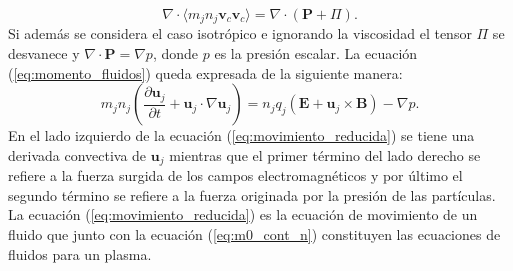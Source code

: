 \documentclass[../tesis_main_file.tex]{subfiles}
\begin{document}
\begin{equation}
\label{eq:tensor_p_vis}
\nabla \cdot \langle m_jn_j \textbf{v}_c \textbf{v}_c \rangle= \nabla \cdot (\textbf{P}+ \Pi).
\end{equation}
Si además se considera el caso isotrópico e ignorando la viscosidad el tensor $\Pi$ se desvanece y $\nabla \cdot \textbf{P}=\nabla p$, donde $p$ es la presión escalar. La ecuación (\ref{eq:momento_fluidos}) queda expresada de la siguiente manera:
\begin{equation}
\label{eq:movimiento_reducida}
m_jn_j \left( \frac{\partial \textbf{u}_j}{\partial t}+\textbf{u}_j\cdot \nabla \textbf{u}_j \right)= n_jq_j(\textbf{E}+\textbf{u}_j\times \textbf{B})- \nabla p.
\end{equation}
En el lado izquierdo de la ecuación (\ref{eq:movimiento_reducida}) se tiene una derivada convectiva de $\textbf{u}_j$ mientras que el primer término del lado derecho se refiere a la fuerza surgida de los campos electromagnéticos y por último el segundo término se refiere a la fuerza originada por la presión de las partículas.
La ecuación (\ref{eq:movimiento_reducida}) es la ecuación de movimiento de un fluido que junto con la ecuación (\ref{eq:m0_cont_n}) constituyen las ecuaciones de fluidos para un plasma.
\end{document}
